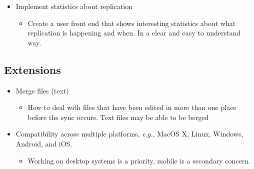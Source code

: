 \documentclass[12pt]{article}
\begin{document}
\begin{itemize}

    \item Implement statistics about replication
        \begin{itemize}
        \item Create a user front end that shows interesting statistics about what replication is happening and when. In a clear and easy to understand way.
        \end{itemize}

\end{itemize}

\subsection*{Extensions} %
\begin{itemize}
\item Merge files (text)
        \begin{itemize}
        \item How to deal with files that have been edited in more than one place before the sync occurs. Text files may be able to be berged
        \end{itemize}

\item Compatibility across multiple platforms, \emph{e.g.}, MacOS X, Linux, Windows, Android, and iOS.
        \begin{itemize}
        \item Working on desktop systems is a priority, mobile is a secondary concern.
        \end{itemize}
\end{itemize}
\end{document}
